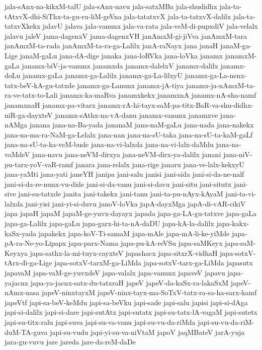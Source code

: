 {jala-sAnx-na-kikxM-talU
jala-sAnx-navu
jala-satxMBa
jala-shudidhx
jala-ta-tAtxvX-dhi-SiThx-ta-gu-ru-liM-geVna
jala-tatatxvX
jala-ta-tatxvX-dalilx
jala-ta-tatxvXkekx
jalavU
jalava
jala-vanunx
jala-va-rata
jala-veM-di-pupxdiV
jala-velalx
jalavu
jaleV
jama-dagenxV
jama-dagenxVH
janAmxM-gi-jiVva
janAmxM-tara
janAmxM-ta-rada
janAmxM-ta-ra-ga-Lalilx
janA-raNayx
jana
janaH
janaM-ga-Lige
janaM-gaLu
jana-dA-dige
janaka
jana-loRVka
jana-loVka
janamx
janamxM-gaLa
janamx-biV-ja-vanunx
janamxda
janamx-dalelxV
janamx-dalilx
janamx-doLu
janamx-gaLa
janamx-ga-Lalilx
janamx-ga-La-lilxyU
janamx-ga-La-nenx-tatx-beV-kA-gu-tatxde
janamx-ga-Lanunx
janamx-jA-tiya
janamx-ja-nAmxM-ta-ra-ve-tatx-to-Lali
janamx-ka-maRva
janamxkekx
janamxnA
janamx-nA-sha-namf
janamxnaH
janamx-pa-vitarx
janamx-rA-hi-tayx-saM-pa-titx-BaR-va-shu-didhx-niR-ga-dayxteV
janamx-sAthx-na-vA-danu
janamx-vanunx
janamxve
jana-nAMga
janana
jana-na-Ba-yada
jananaM
jana-naM-gaLu
jana-nada
jana-nakekx
jana-na-ma-ra-NaM-ga-Lelalx
jana-nan
jana-na-sU-taka
jana-na-sU-ta-kaM-gaLf
jana-na-sU-ta-ka-veM-bude
jana-na-vi-lalxda
jana-na-vi-lalx-daMdu
jana-na-voMdeV
jana-navu
jana-neVM-dirxya
jana-neVM-dirx-ya-dalilx
janani
jana-niV-pu-tarx-yoV-vaR-ramf
janara
jana-relalx
jana-rige
janaru
jana-ve-lalx-kekxyU
jana-yaMti
jana-yati
janeYH
janipa
jani-salu
janisi
jani-sida
jani-si-da-ne-nalf
jani-si-da-re-nunx-vu-dide
jani-si-da-vanu
jani-si-davu
jani-situ
jani-situtx
jani-sive
jani-su-tatxde
janita
jani-takekx
jani-tanu
jani-ta-pu-nAyx-kAyaM
jani-ta-vi-lalxda
jani-yisi
jani-yi-si-duvu
janoV-loVka
japA-dayxMga
japA-di-vAR-cikiV
japa
japaH
japaM
japaM-ge-yuvx-dayayx
japada
japa-ga-LA-gu-tatxve
japa-gaLa
japa-ga-Lalilx
japa-gaLu
japa-garx-hi-ta-nA-daDU
japa-kA-la-dalilx
japa-kakx-kaSx-yada
japakekx
japa-koV-Ti-samaM
japa-mAle
japa-mA-li-ke-yiMde
japa-pA-ra-Ne-yo-Lipapx
japa-parx-Nama
japa-pu-kA-reVSu
japa-saMKeyx
japa-saM-Keyxya
japa-sathx-la-mi-tuyx-cayxteV
japashacx
japa-sitxrX-vidhaH
japa-sotxV-tArx-di-ga-Lige
japa-sotxV-tarxM-ga-LiMda
japa-sotxV-tarx-ga-LiMda
japasutx
japavaM
japa-vaM-ge-yuvxdeV
japa-valalx
japa-vanunx
japaveV
japavu
japa-yajacnx
japa-ya-jacnx-satx-du-tatxraH
japeV
japeV-da-kaSx-ra-lakaSxM
japeV-nAmx-nasa
japeV-ninxtayxM
japeV-ninx-tayx-ma-SoTxV-tatx-ra-sa-ha-sarx-kamf
japeVtf
japi-sa-beV-keMdu
japi-sa-beVku
japi-sade
japi-salu
japisi
japi-si-dAga
japi-si-dalilx
japi-si-dare
japi-sutAtx
japi-sutatx
japi-su-tatx-lA-vagaM
japi-sutetx
japi-su-titx-ralu
japi-suva
japi-su-va-vanu
japi-su-vu-da-riMda
japi-su-vu-da-riM-duM-TA-guva
japi-su-vudu
japi-yi-su-va-niVtaM
japoV
jaqMBateV
jarA-yuja
jara-gu-vuvu
jare
jareda
jare-da-reM-daDe
}
